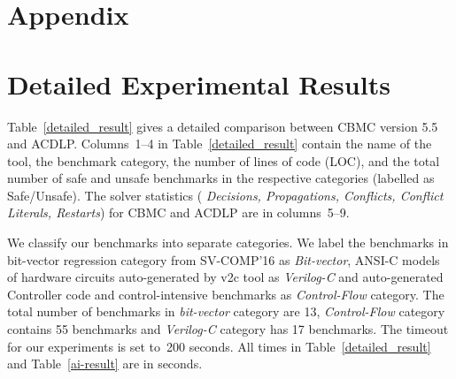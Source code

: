 \appendix
\section*{Appendix}
%
\section{Detailed Experimental Results}\label{appendix:extended_result}
Table~\ref{detailed_result} gives a detailed comparison between CBMC version
5.5 and ACDLP.  Columns~1--4 in Table~\ref{detailed_result} contain the
name of the tool, the benchmark category, the number of lines of code (LOC),
and the total number of safe and unsafe benchmarks in the respective
categories (labelled as Safe/Unsafe).  The solver statistics ({\em
Decisions, Propagations, Conflicts, Conflict Literals, Restarts}) 
for CBMC and ACDLP are in columns~5--9.
%

We classify our benchmarks into separate categories. 
We label the benchmarks in bit-vector regression category from SV-COMP'16 
as {\em Bit-vector}, ANSI-C models of hardware circuits auto-generated by v2c 
tool as {\em Verilog-C} and auto-generated Controller code and control-intensive 
benchmarks as {\em Control-Flow} category.  The total number of benchmarks in 
{\em bit-vector} category are 13, {\em Control-Flow} category contains 
55 benchmarks and {\em Verilog-C} category has 17 benchmarks. The timeout for 
our experiments is set to~200 seconds.  All times in Table~\ref{detailed_result} 
and Table~\ref{ai-result} are in seconds. 

